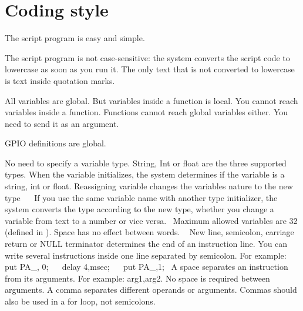 \chapter{Coding style}
\hypertarget{03_coding_format}{}\label{03_coding_format}
The script program is easy and simple.
\begin{DoxyItemize}
\item The script program is not case-\/sensitive\+: the system converts the script code to lowercase as soon as you run it. The only text that is not converted to lowercase is text inside quotation marks.
\item All variables are global. But variables inside a function is local. You cannot reach variables inside a function. Functions cannot reach global variables either. You need to send it as an argument.
\item GPIO definitions are global.
\item No need to specify a variable type. String, Int or float are the three supported types. When the variable initializes, the system determines if the variable is a string, int or float. Reassigning variable changes the variables nature to the new type~\newline
 ~\newline
If you use the same variable name with another type initializer, the system converts the type according to the new type, whether you change a variable from text to a number or vice versa.~\newline
 Maximum allowed variables are 32 (defined in ). Space has no effect between words. ~\newline
New line, semicolon, carriage return or NULL terminator determines the end of an instruction line. You can write several instructions inside one line separated by semicolon. For example\+: ~\newline
 put PA\+\_, 0; ~ ~delay 4,msec; ~~ put PA\+\_,1;~\newline
 A space separates an instruction from its arguments. For example\+: arg1,arg2. No space is required between arguments. A comma separates different operands or arguments. Commas should also be used in a for loop, not semicolons. 
\end{DoxyItemize}